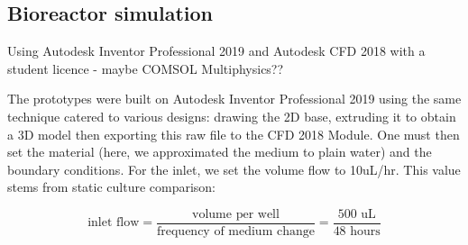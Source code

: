 \documentclass[onecolumn,10pt]{asme2ej}
\begin{document}
%

\subsection{Bioreactor simulation}
Using Autodesk Inventor Professional 2019 and Autodesk CFD 2018 with a student licence - maybe COMSOL Multiphysics??

The prototypes were built on Autodesk Inventor Professional 2019 using the same technique catered to various designs: drawing the 2D base, extruding it to obtain a 3D model then exporting this raw file to the CFD 2018 Module. One must then set the material (here, we approximated the medium to plain water) and the boundary conditions. For the inlet, we set the volume flow to 10uL/hr. This value stems from static culture comparison: 

 \begin{equation}
 \text{inlet flow} = \frac{\text{volume per well}}{\text{frequency of medium change}} = \frac{500\text{ uL}}{48 \text{ hours}}
 \end{equation}
 
\end{document}
